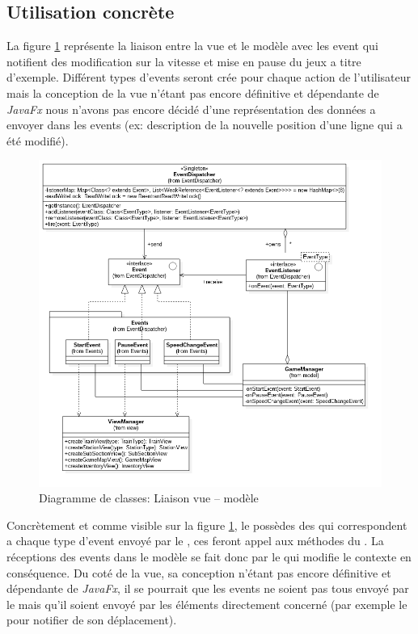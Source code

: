\documentclass[report, backcover, french, nodocumentinfo]{upmethodology-document}
\begin{document}
			\subsection{Utilisation concrète}
				\p{}
					La figure \ref{fig:ViewModelLinkClassDiagram} représente la liaison entre la vue et le modèle avec les event qui notifient des modification sur la vitesse et mise en pause du jeux a titre d'exemple. Différent types d'events seront crée pour chaque action de l'utilisateur mais la conception de la vue n'étant pas encore définitive et dépendante de \textit{JavaFx} nous n'avons pas encore décidé d'une représentation des données a envoyer dans les events (ex: description de la nouvelle position d'une ligne qui a été modifié).
					\begin{figure}[h!]
						\centering
						\includegraphics[width=\textwidth]{figures/ViewModelLinkClassDiagram}
						\caption{Diagramme de classes: Liaison vue -- modèle}
						\label{fig:ViewModelLinkClassDiagram}
					\end{figure}
				\p{}
					Concrètement et comme visible sur la figure \ref{fig:ViewModelLinkClassDiagram}, le  possèdes des  qui correspondent a chaque type d'event envoyé par le , ces  feront appel aux méthodes  du . La réceptions des events dans le modèle se fait donc par le  qui modifie le contexte en conséquence. Du coté de la vue, sa conception n'étant pas encore définitive et dépendante de \textit{JavaFx}, il se pourrait que les events ne soient pas tous envoyé par le  mais qu'il soient envoyé par les éléments directement concerné (par exemple le  pour notifier de son déplacement).
\end{document}
